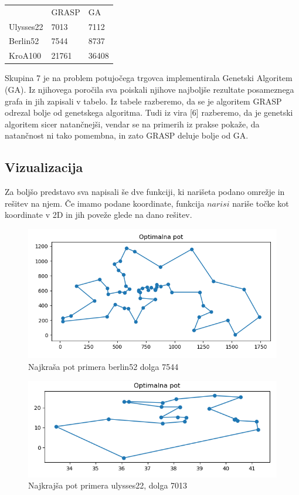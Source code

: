 \documentclass[12pt,a4paper]{amsart}
\theoremstyle{definition} %
\theoremstyle{plain} %
\begin{document}
\begin{table}[H]
\begin{tabular}{lll}
\rowcolor[HTML]{FFCCC9} 
          & GRASP & GA \\
Ulysses22 & 7013  & 7112               \\
Berlin52  & 7544  & 8737               \\
KroA100   & 21761 & 36408             
\end{tabular}
\end{table}

Skupina 7 je na problem potujočega trgovca implementirala Genetski Algoritem (GA). Iz njihovega poročila sva poiskali njihove najboljše rezultate posameznega grafa in jih zapisali v tabelo. Iz tabele razberemo, da se je algoritem GRASP odrezal bolje od genetskega algoritma.
Tudi iz vira [6] razberemo, da je genetski algoritem sicer natančnejši, vendar se na primerih iz prakse pokaže, da natančnost ni tako pomembna, in zato GRASP deluje bolje od GA.

\subsection{Vizualizacija}
Za boljšo predstavo sva napisali še dve funkciji, ki narišeta podano omrežje in rešitev na njem.
Če imamo podane koordinate, funkcija $narisi$ nariše točke kot koordinate v 2D in jih poveže glede na dano rešitev.
\begin{figure}[H]
\caption{Najkraša pot primera berlin52 dolga 7544}
\centering
\includegraphics[scale =0.5]{berlin_7544}
\end{figure}

\begin{figure}[H]
\caption{Najkrajša pot primera ulysses22, dolga 7013}
\centering
\includegraphics[scale =0.5]{ulysses22_7013}
\end{figure}
\end{document}
